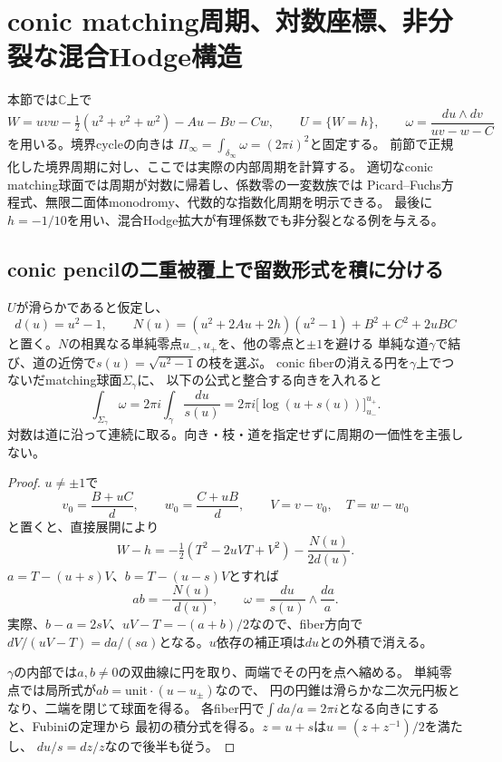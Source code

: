 \section{conic matching周期、対数座標、非分裂な混合Hodge構造}
\label{sec:logarithmic-periods}
本節では$\mathbb C$上で
\[
 W=uvw-\tfrac12(u^2+v^2+w^2)-Au-Bv-Cw,\qquad U=\{W=h\},
 \qquad\omega=\frac{du\wedge dv}{uv-w-C}
\]
を用いる。境界cycleの向きは
$\Pi_\infty=\int_{\delta_\infty}\omega=(2\pi i)^2$と固定する。
前節で正規化した境界周期に対し、ここでは実際の内部周期を計算する。
適切なconic matching球面では周期が対数に帰着し、係数零の一変数族では
Picard--Fuchs方程式、無限二面体monodromy、代数的な指数化周期を明示できる。
最後に$h=-1/10$を用い、混合Hodge拡大が有理係数でも非分裂となる例を与える。

\subsection{conic pencilの二重被覆上で留数形式を積に分ける}
\begin{theorem}[matching球面の対数周期]
\label{thm:conic-matching-log-period}
$U$が滑らかであると仮定し、
\[
 d(u)=u^2-1,\qquad
 N(u)=(u^2+2Au+2h)(u^2-1)+B^2+C^2+2uBC
\]
と置く。$N$の相異なる単純零点$u_-,u_+$を、他の零点と$\pm1$を避ける
単純な道$\gamma$で結び、道の近傍で$s(u)=\sqrt{u^2-1}$の枝を選ぶ。
conic fiberの消える円を$\gamma$上でつないだmatching球面$\Sigma_\gamma$に、
以下の公式と整合する向きを入れると
\begin{equation}\label{eq:conic-matching-period}
 \int_{\Sigma_\gamma}\omega
 =2\pi i\int_\gamma\frac{du}{s(u)}
 =2\pi i\bigl[\log(u+s(u))\bigr]_{u_-}^{u_+}.
\end{equation}
対数は道に沿って連続に取る。向き・枝・道を指定せずに周期の一価性を主張しない。
\end{theorem}
\begin{proof}
$u\ne\pm1$で
\[
 v_0=\frac{B+uC}{d},\qquad w_0=\frac{C+uB}{d},\qquad
 V=v-v_0,\quad T=w-w_0
\]
と置くと、直接展開により
\[
 W-h=-\tfrac12(T^2-2uVT+V^2)-\frac{N(u)}{2d(u)}.
\]
$a=T-(u+s)V$、$b=T-(u-s)V$とすれば
\begin{equation}\label{eq:conic-multiplicative-model}
 ab=-\frac{N(u)}{d(u)},\qquad
 \omega=\frac{du}{s(u)}\wedge\frac{da}{a}.
\end{equation}
実際、$b-a=2sV$、$uV-T=-(a+b)/2$なので、fiber方向で
$dV/(uV-T)=da/(sa)$となる。$u$依存の補正項は$du$との外積で消える。

$\gamma$の内部では$a,b\ne0$の双曲線に円を取り、両端でその円を点へ縮める。
単純零点では局所式が$ab=\text{unit}\cdot(u-u_\pm)$なので、
円の円錐は滑らかな二次元円板となり、二端を閉じて球面を得る。
各fiber円で$\int da/a=2\pi i$となる向きにすると、Fubiniの定理から
最初の積分式を得る。$z=u+s$は$u=(z+z^{-1})/2$を満たし、
$du/s=dz/z$なので後半も従う。
\end{proof}

